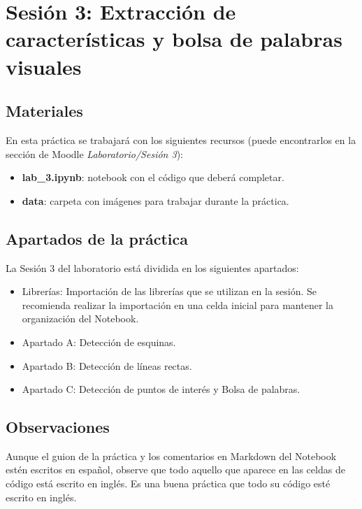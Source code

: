 \chapter{Sesión 3: Extracción de características y bolsa de palabras visuales}
\label{chapter:introduction_ses_3}

\section{Materiales}

En esta práctica se trabajará con los siguientes recursos (puede encontrarlos en la sección de Moodle \textit{Laboratorio/Sesión 3}):

\begin{itemize}
    \item \textbf{lab\_3.ipynb}: notebook con el código que deberá completar.
    \item \textbf{data}: carpeta con imágenes para trabajar durante la práctica.
\end{itemize}

\section{Apartados de la práctica}

La Sesión 3 del laboratorio está dividida en los siguientes apartados:

\begin{itemize}
    \item Librerías: Importación de las librerías que se utilizan en la sesión. Se recomienda realizar la importación en una celda inicial para mantener la organización del Notebook.
    \item Apartado A: Detección de esquinas.
    \item Apartado B: Detección de líneas rectas.
    \item Apartado C: Detección de puntos de interés y Bolsa de palabras.
\end{itemize}

\section{Observaciones}

Aunque el guion de la práctica y los comentarios en Markdown del Notebook estén escritos en español, observe que todo aquello que aparece en las celdas de código está escrito en inglés. Es una buena práctica que todo su código esté escrito en inglés.

